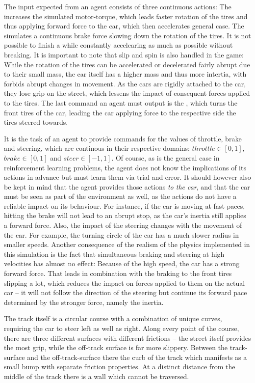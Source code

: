 The input expected from an agent consists of three continuous actions: The  increases the simulated motor-torque, which leads faster rotation of the tires and thus applying forward force to the car, which then accelerates general case. The  simulates a continuous brake force slowing down the rotation of the tires. It is not possible to finish a while constantly accelearing as much as possible without breaking. It is important to note that slip and spin is also handled in the game: While the rotation of the tires can be accelerated or decelerated fairly abrupt due to their small mass, the car itself has a higher mass and thus more intertia, with forbids abrupt changes in movement. As the cars are rigidly attached to the car, they lose grip on the street, which lessens the impact of consequent forces applied to the tires. The last command an agent must output is the , which turns the front tires of the car, leading the car applying force to the respective side the tires steered towards.

It is the task of an agent to provide commands for the values of throttle, brake and steering, which are continous in their respective domains: $throttle \in [0,1]$, $brake \in [0,1]$ and $steer \in[-1,1]$. Of course, as is the general case in reinforcement learning problems, the agent does not know the implications of its actions in advance but must learn them via trial and error. It should however also be kept in mind that the agent provides those actions \textit{to the car}, and that the car must be seen as part of the environment as well, as the actions do not have a reliable impact on its behaviour. For instance, if the car is moving at fast paces, hitting the brake will not lead to an abrupt stop, as the car's inertia still applies a forward force. Also, the impact of the steering changes with the movement of the car. For example, the turning circle of the car has a much slower radius in smaller speeds. Another consequence of the realism of the physics implemented in this simulation is the fact that simultaneous braking and steering at high velocities has almost no effect: Because of the high speed, the car has a strong forward force. That leads in combination with the braking to the front tires slipping a lot, which reduces the impact on forces applied to them on the actual car -- it will not follow the direction of the steering but continue its forward pace determined by the stronger force, namely the inertia.

The track itself is a circular course with a combination of unique curves, requiring the car to steer left as well as right. Along every point of the course, there are three different surfaces with different frictions -- the street itself provides the most grip, while the off-track surface is far more slippery. Between the track-surface and the off-track-surface there the curb of the track which manifests as a small bump with separate friction properties. At a distinct distance from the middle of the track there is a wall which cannot be traversed.

